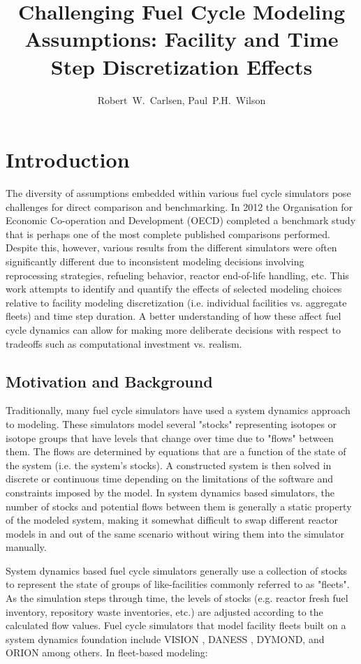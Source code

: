 \documentclass{style}
\title{Challenging Fuel Cycle Modeling Assumptions: Facility and Time Step Discretization Effects}
\author{Robert~W.~Carlsen, Paul~P.H.~Wilson}
\institute{University of Wisconsin - Madison, Department of Nuclear Engineering and Engineering Physics, Madison, WI 53706}
\date{}
\begin{document}
\section{Introduction}


The diversity of assumptions embedded within various fuel cycle simulators pose challenges for direct
comparison and benchmarking.  In 2012 the Organisation for
Economic Co-operation and Development (OECD) completed a benchmark study
\cite{oecd2012benchmark} that is perhaps one of the most complete published
comparisons performed.  Despite this, however, various results from the
different simulators were often significantly different due to inconsistent
modeling decisions involving reprocessing strategies, refueling behavior,
reactor end-of-life handling, etc.  This work attempts to identify and
quantify the effects of selected modeling choices relative to facility modeling
discretization (i.e. individual facilities vs. aggregate fleets) and time step
duration.  A better understanding of how these affect fuel cycle dynamics can
allow for making more deliberate decisions with respect to tradeoffs such as
computational investment vs. realism.

\subsection{Motivation and Background}

Traditionally, many fuel cycle simulators have used a system dynamics approach
\cite{forrester_industrial_1961} to modeling. These simulators model several
"stocks" representing isotopes or isotope groups that have levels that change
over time due to "flows" between them.  The flows are determined by equations
that are a function of the state of the system (i.e. the system's stocks).  A
constructed system is then solved in discrete or continuous time depending on
the limitations of the software and constraints imposed by the model.  In
system dynamics based simulators, the number of stocks and potential flows between
them is generally a static property of the modeled system, making it somewhat
difficult to swap different reactor models in and out of the same scenario
without wiring them into the simulator manually.

System dynamics based fuel cycle simulators generally use a collection of
stocks to represent the state of groups of like-facilities commonly referred
to as "fleets".  As the simulation steps through time, the levels of stocks
(e.g. reactor fresh fuel inventory, repository waste inventories, etc.) are
adjusted according to the calculated flow values.  Fuel cycle simulators that model
facility fleets built on a system dynamics foundation include VISION
\cite{jacobson_verifiable_2010}, DANESS \cite{van_den_durpel_daness_2009},
DYMOND, and ORION \cite{gregg_orion_2012} among
others.  In fleet-based modeling:
\end{document}
